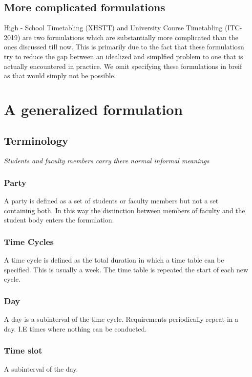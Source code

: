 \documentclass[11pt]{article}
\begin{document}
\subsection{More complicated formulations}
High - School Timetabling (XHSTT) and University Course Timetabling (ITC-2019) are two formulations which are substantially more complicated than the ones discussed till now. This is primarily due to the fact that these formulatiosn try to reduce the gap between an idealized and simplfied problem to one that is actually encountered in practice. We omit specifying these formulations in breif as that would simply not be possible.

\section{A generalized formulation}

\subsection{Terminology}

\textit{Students and faculty members carry there normal informal meanings}

\subsubsection{Party}
A party is defined as a set of students or faculty members but not a set containing both. In this way the distinction between members of faculty and the student body enters the formulation.

\subsubsection{Time Cycles}
A time cycle is defined as the total duration in which a time table can be specified. This is usually a week. The time table is repeated the start of each new cycle.

\subsubsection{Day}
A day is a subinterval of the time cycle. Requirements periodically repeat in a day. I.E times where nothing can be conducted.

\subsubsection{Time slot}
A subinterval of the day.
\end{document}
